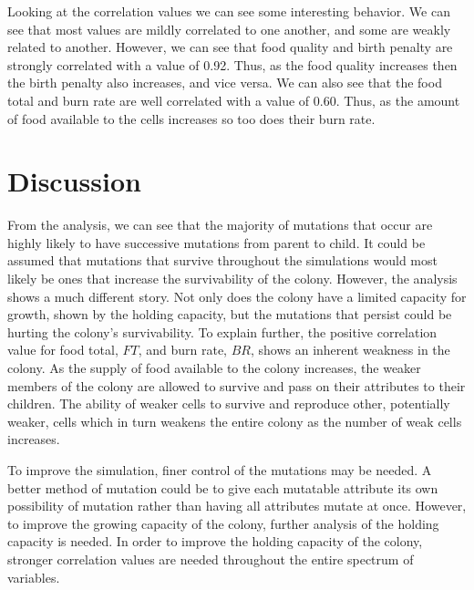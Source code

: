 \documentclass[12pt]{article}
\begin{document}
	Looking at the correlation values we can see some interesting behavior. 
	We can see that most values are mildly correlated to one another, and some are weakly related to another.
	However, we can see that food quality and birth penalty are strongly correlated with a value of 0.92.
	Thus, as the food quality increases then the birth penalty also increases, and vice versa.
	We can also see that the food total and burn rate are well correlated with a value of 0.60.
	Thus, as the amount of food available to the cells increases so too does their burn rate.

\section{Discussion}

	From the analysis, we can see that the majority of mutations that occur are highly likely to have successive mutations from parent to child.
	It could be assumed that mutations that survive throughout the simulations would most likely be ones that increase the survivability of the colony.
	However, the analysis shows a much different story.
	Not only does the colony have a limited capacity for growth, shown by the holding capacity, but the mutations that persist could be hurting the colony's survivability.
	To explain further, the positive correlation value for food total, $FT$, and burn rate, $BR$, shows an inherent weakness in the colony.
	As the supply of food available to the colony increases, the weaker members of the colony are allowed to survive and pass on their attributes to their children.
	The ability of weaker cells to survive and reproduce other, potentially weaker, cells which in turn weakens the entire colony as the number of weak cells increases.

	To improve the simulation, finer control of the mutations may be needed. 
	A better method of mutation could be to give each mutatable attribute its own possibility of mutation rather than having all attributes mutate at once.
	However, to improve the growing capacity of the colony, further analysis of the holding capacity is needed.
	In order to improve the holding capacity of the colony, stronger correlation values are needed throughout the entire spectrum of variables.
\end{document}
